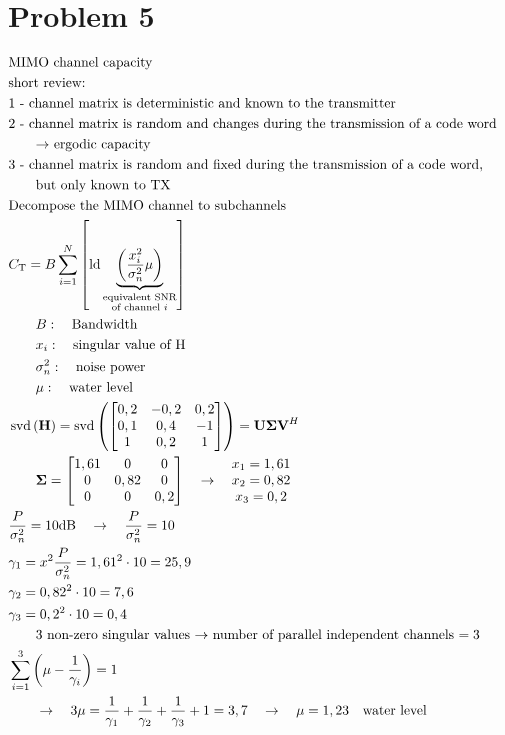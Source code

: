\section*{Problem 5}
\begin{align*}
	&\text{MIMO channel capacity}& \\ 
	&\text{short review:}& \\
	&\text{1 - channel matrix is deterministic and known to the transmitter}& \\
	&\text{2 - channel matrix is random and changes during the transmission of a code word}& \\
	&\qquad\text{$\rightarrow$ ergodic capacity}& \\
	&\text{3 - channel matrix is random and fixed during the transmission of a code word,}& \\ 
	&\qquad\text{but only known to TX}& \\
	&\text{Decompose the MIMO channel to subchannels}& \\
	&C_{\mathrm{T}}=B\sum_{i=1}^{N}\left[\operatorname{ld}\underbrace{\left(\frac{x_{i}^{2}}{\sigma_{n}^{2}}\mu\right)}_{\substack{\text{equivalent SNR} \\ \text{of channel $i$}}}\right]& \\
	&\qquad B:\quad\text{Bandwidth}& \\
	&\qquad x_{i}:\quad\text{singular value of H}& \\
	&\qquad\sigma_{n}^{2}:\quad\text{noise power}& \\
	&\qquad\mu :\quad\text{water level}& \\
	&\operatorname{svd}\left(\mathbf{H}\right)=\operatorname{svd}\left(
	\begin{bmatrix}
	0,2 & -0,2 & 0,2 \\
	0,1 & 0,4 & -1 \\
	1 & 0,2 & 1
	\end{bmatrix}\right)=\mathbf{U\Sigma V}^{H}& \\
	&\qquad\mathbf{\Sigma}=
	\begin{bmatrix}
	1,61 & 0 & 0 \\
	0 & 0,82 & 0 \\
	0 & 0 & 0,2
	\end{bmatrix}\quad\rightarrow\quad
	\begin{matrix}
	x_{1} = 1,61 \\
	x_{2} = 0,82 \\
	x_{3} = 0,2
	\end{matrix}& \\
	&\frac{P}{\sigma_{n}^{2}}=10\mathrm{dB}\quad\rightarrow\quad\frac{P}{\sigma_{n}^{2}}=10& \\
	&\gamma_{1}=x^{2}\frac{P}{\sigma_{n}^{2}}=1,61^{2}\cdot 10=25,9& \\
	&\gamma_{2}=0,82^{2}\cdot 10=7,6& \\
	&\gamma_{3}=0,2^{2}\cdot 10=0,4& \\
	&\qquad\text{3 non-zero singular values $\rightarrow$ number of parallel independent channels $=3$}& \\
	&\sum_{i=1}^{3}\left(\mu-\frac{1}{\gamma_{i}}\right)=1& \\
	&\qquad\rightarrow\quad 3\mu=\frac{1}{\gamma_{1}}+\frac{1}{\gamma_{2}}+\frac{1}{\gamma_{3}}+1=3,7\quad\rightarrow\quad\mu=1,23\quad\text{water level}&
\end{align*}
